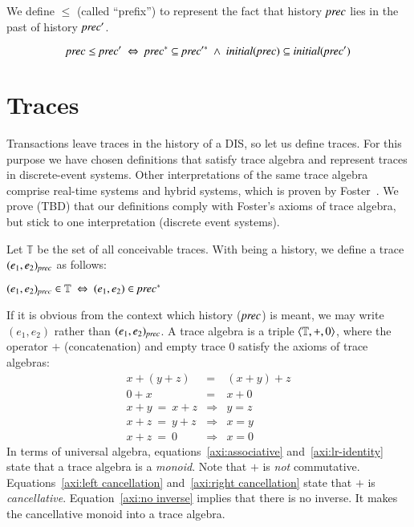 \documentclass{elsarticle}
\def\id#1{\text{\it #1\/}}
\begin{document}
	We define $\leq$ (called ``prefix'') to represent the fact that history $\id{prec}$ lies in the past of history $\id{prec}'$.
\begin{definition}[$\leq$]
\label{def:lies in the past}
\begin{displaymath}
	\id{prec}\leq\id{prec}'\ \Leftrightarrow\ \id{prec}^*\subseteq\id{prec}'^*\ \wedge\ \id{initial}(\id{prec})\subseteq\id{initial}(\id{prec}')
\end{displaymath}
\end{definition}

\section{Traces}
\label{sct:Traces}
	Transactions leave traces in the history of a DIS, so let us define traces.
	For this purpose we have chosen definitions that satisfy trace algebra
	and represent traces in discrete-event systems.
	Other interpretations of the same trace algebra comprise real-time systems and hybrid systems,
	which is proven by Foster~\cite{Foster17b}.
	We prove (TBD) that our definitions comply with Foster's axioms of trace algebra,
	but stick to one interpretation (discrete event systems).

	Let $\mathbb T$ be the set of all conceivable traces.
	With \id{prec} being a history, we define a trace $(e_1,e_2)_\id{prec}$ as follows:
\begin{definition}[Traces]
\label{def:Traces}
\item   $(e_1,e_2)_\id{prec}\in\mathbb T\ \Leftrightarrow\ (e_1,e_2)\in\id{prec}^*$
\end{definition}
	If it is obvious from the context which history ($\id{prec}$) is meant, we may write $(e_1,e_2)$ rather than $(e_1,e_2)_\id{prec}$.
	A trace algebra is a triple $\langle\mathbb T,+,0\rangle$,
	where the operator $+$ (concatenation) and empty trace $0$ satisfy the axioms of trace algebras:
\begin{eqnarray}
	x+(y+z)&=&(x+y)+z\label{axi:associative}\\
	0+x&=&x+0\label{axi:lr-identity}\\
	x+y\ =\ x+z&\Rightarrow&y=z\label{axi:left cancellation}\\
	x+z\ =\ y+z&\Rightarrow&x=y\label{axi:right cancellation}\\
	x+z\ =\ 0&\Rightarrow&x=0\label{axi:no inverse}
\end{eqnarray}
	In terms of universal algebra,
	equations~\ref{axi:associative} and~\ref{axi:lr-identity} state that a trace algebra is a {\em monoid}.
	Note that $+$ is {\em not} commutative.
	Equations~\ref{axi:left cancellation} and~\ref{axi:right cancellation} state that $+$ is {\em cancellative}.
	Equation~\ref{axi:no inverse} implies that there is no inverse.
	It makes the cancellative monoid into a trace algebra.
\end{document}
